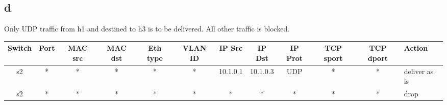 \documentclass[paper=a4, fontsize=11pt]{scrartcl}
\numberwithin{equation}{section}		%
\numberwithin{figure}{section}			%
\numberwithin{table}{section}				%
\begin{document}
\subsection*{d}
Only UDP traffic from h1 and destined to h3 is to be delivered. All other traffic is blocked.



\begin{center}
\begin{tabular}{ | c | c | c | c | c | c | c | c | c | c | c | l | }
  \hline
Switch & Port & MAC src & MAC dst & Eth type & VLAN ID & IP Src & IP Dst & IP Prot & TCP sport & TCP dport & Action \\
  \hline
  s2 & * & * & * & * & * & 10.1.0.1 & 10.1.0.3 & UDP & * & * & deliver as is \\
  \hline
  s2 & * & * & * & * & * & * & * & * & * & * & drop \\
  \hline

\end{tabular}
\end{center}

\end{document}
